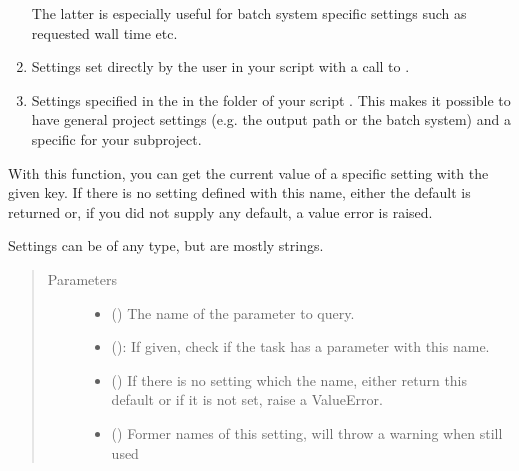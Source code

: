 \documentclass[letterpaper,10pt,english]{sphinxmanual}
\begin{document}
\begin{fulllineitems}
\begin{enumerate}
The latter is especially useful for batch system specific settings
such as requested wall time etc.

\item {} 
Settings set directly by the user in your script with a call to
{\hyperref[\detokenize{documentation/api:b2luigi.set_setting}]{}}.

\item {} 
Settings specified in the  in the folder of your
script .
This makes it possible to have general project settings (e.g. the output path
or the batch system) and a specific  for your sub\sphinxhyphen{}project.

\end{enumerate}

With this function, you can get the current value of a specific setting with the given key.
If there is no setting defined with this name,
either the default is returned or, if you did not supply any default, a value error is raised.

Settings can be of any type, but are mostly strings.
\begin{quote}\begin{description}
\item[{Parameters}] \leavevmode\begin{itemize}
\item {} 
 () \textendash{} The name of the parameter to query.

\item {} 
 \textendash{} ({\hyperref[\detokenize{documentation/api:b2luigi.Task}]{}}): If given, check if the task has a parameter
with this name.

\item {} 
 () \textendash{} If there is no setting which the name,
either return this default or if it is not set,
raise a ValueError.

\item {} 
 () \textendash{} Former names of this setting,
will throw a warning when still used

\end{itemize}

\end{description}\end{quote}

\end{fulllineitems}
\end{document}
